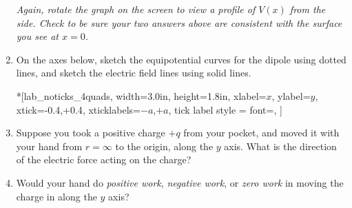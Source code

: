 \begin{enumerate}[labparts]
\textit{Again, rotate the graph on the screen to view a profile of $V(x)$ from the side.  Check to be sure your two answers above are consistent with the surface you see at $x=0$.}

\item On the axes below, sketch the equipotential curves for the dipole using dotted lines, and sketch the electric field lines using solid lines.

\begin{lab_axis}*[lab_noticks_4quads,
	width={3.0in}, height={1.8in},
	xlabel=$x$,
	ylabel=$y$,
	xtick={-0.4,+0.4},
	xticklabels={$-a$,$+a$},
	tick label style = {font=\itshape},
	]
\end{lab_axis}

\item Suppose you took a positive charge $+q$ from your pocket, and moved it with your hand from $r=\infty$ to the origin, along the $y$ axis.  What is the direction of the electric force acting on the charge?
\answerspace{0.5in}

\item Would your hand do \textit{positive work}, \textit{negative work}, or \textit{zero work} in moving the charge in along the $y$ axis?
\answerspace{0.3in}
\end{enumerate}

